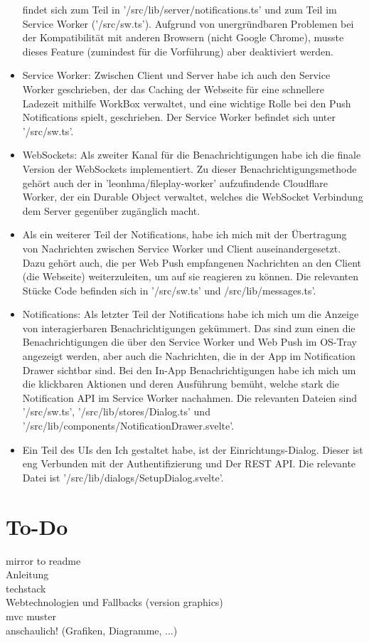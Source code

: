 \documentclass[a4paper]{article}
\begin{document}
\begin{itemize}
        findet sich zum Teil in '/src/lib/server/notifications.ts' und zum Teil
        im Service Worker ('/src/sw.ts'). Aufgrund von unergründbaren Problemen bei der
        Kompatibilität mit anderen Browsern (nicht Google Chrome), musste dieses
        Feature (zumindest für die Vorführung) aber deaktiviert werden.
  \item Service Worker: Zwischen Client und Server habe ich auch den Service
        Worker geschrieben, der das Caching der Webseite für eine schnellere
        Ladezeit mithilfe WorkBox verwaltet, und eine wichtige Rolle bei den
        Push Notifications spielt, geschrieben. Der Service Worker befindet sich
        unter '/src/sw.ts'.
  \item WebSockets: Als zweiter Kanal für die Benachrichtigungen habe ich die
        finale Version der WebSockets implementiert. Zu dieser
        Benachrichtigungsmethode gehört auch der in 'leonhma/fileplay-worker'
        aufzufindende Cloudflare Worker, der ein Durable Object verwaltet,
        welches die WebSocket Verbindung dem Server gegenüber zugänglich macht.
  \item Als ein weiterer Teil der Notifications, habe ich mich mit der
        Übertragung von Nachrichten zwischen Service Worker und Client
        auseinandergesetzt. Dazu gehört auch, die per Web Push empfangenen
        Nachrichten an den Client (die Webseite) weiterzuleiten, um auf sie
        reagieren zu können. Die relevanten Stücke Code befinden sich in
        '/src/sw.ts' und /src/lib/messages.ts'.
  \item Notifications: Als letzter Teil der Notifications habe ich mich um die
        Anzeige von interagierbaren Benachrichtigungen gekümmert. Das sind zum
        einen die Benachrichtigungen die über den Service Worker und Web Push im
        OS-Tray angezeigt werden, aber auch die Nachrichten, die in der App im
        Notification Drawer sichtbar sind. Bei den In-App Benachrichtigungen
        habe ich mich um die klickbaren Aktionen und deren Ausführung bemüht,
        welche stark die Notification API im Service Worker nachahmen. Die
        relevanten Dateien sind '/src/sw.ts', '/src/lib/stores/Dialog.ts' und
        '/src/lib/components/NotificationDrawer.svelte'.
  \item Ein Teil des UIs den Ich gestaltet habe, ist der Einrichtungs-Dialog.
        Dieser ist eng Verbunden mit der Authentifizierung und Der REST API. Die
        relevante Datei ist '/src/lib/dialogs/SetupDialog.svelte'.
\end{itemize}



\section{To-Do}
mirror to readme\\
Anleitung\\
techstack\\
Webtechnologien und Fallbacks (version graphics)\\
mvc muster\\
anschaulich! (Grafiken, Diagramme, ...)
\end{document}
